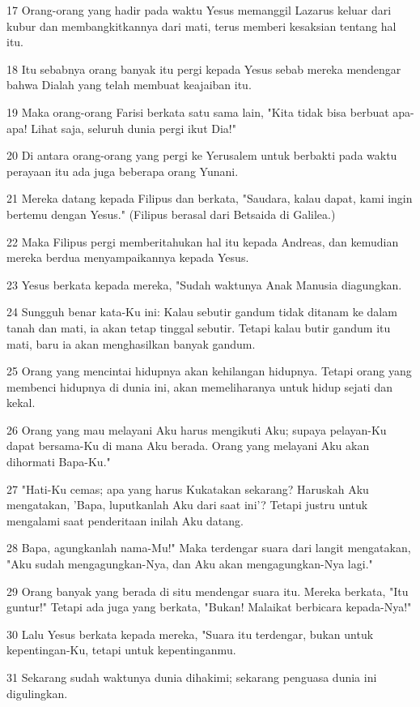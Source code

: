\par 17 Orang-orang yang hadir pada waktu Yesus memanggil Lazarus keluar dari kubur dan membangkitkannya dari mati, terus memberi kesaksian tentang hal itu.
\par 18 Itu sebabnya orang banyak itu pergi kepada Yesus sebab mereka mendengar bahwa Dialah yang telah membuat keajaiban itu.
\par 19 Maka orang-orang Farisi berkata satu sama lain, "Kita tidak bisa berbuat apa-apa! Lihat saja, seluruh dunia pergi ikut Dia!"
\par 20 Di antara orang-orang yang pergi ke Yerusalem untuk berbakti pada waktu perayaan itu ada juga beberapa orang Yunani.
\par 21 Mereka datang kepada Filipus dan berkata, "Saudara, kalau dapat, kami ingin bertemu dengan Yesus." (Filipus berasal dari Betsaida di Galilea.)
\par 22 Maka Filipus pergi memberitahukan hal itu kepada Andreas, dan kemudian mereka berdua menyampaikannya kepada Yesus.
\par 23 Yesus berkata kepada mereka, "Sudah waktunya Anak Manusia diagungkan.
\par 24 Sungguh benar kata-Ku ini: Kalau sebutir gandum tidak ditanam ke dalam tanah dan mati, ia akan tetap tinggal sebutir. Tetapi kalau butir gandum itu mati, baru ia akan menghasilkan banyak gandum.
\par 25 Orang yang mencintai hidupnya akan kehilangan hidupnya. Tetapi orang yang membenci hidupnya di dunia ini, akan memeliharanya untuk hidup sejati dan kekal.
\par 26 Orang yang mau melayani Aku harus mengikuti Aku; supaya pelayan-Ku dapat bersama-Ku di mana Aku berada. Orang yang melayani Aku akan dihormati Bapa-Ku."
\par 27 "Hati-Ku cemas; apa yang harus Kukatakan sekarang? Haruskah Aku mengatakan, 'Bapa, luputkanlah Aku dari saat ini'? Tetapi justru untuk mengalami saat penderitaan inilah Aku datang.
\par 28 Bapa, agungkanlah nama-Mu!" Maka terdengar suara dari langit mengatakan, "Aku sudah mengagungkan-Nya, dan Aku akan mengagungkan-Nya lagi."
\par 29 Orang banyak yang berada di situ mendengar suara itu. Mereka berkata, "Itu guntur!" Tetapi ada juga yang berkata, "Bukan! Malaikat berbicara kepada-Nya!"
\par 30 Lalu Yesus berkata kepada mereka, "Suara itu terdengar, bukan untuk kepentingan-Ku, tetapi untuk kepentinganmu.
\par 31 Sekarang sudah waktunya dunia dihakimi; sekarang penguasa dunia ini digulingkan.
